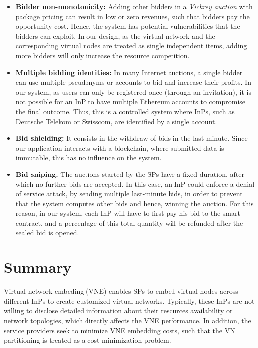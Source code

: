 \begin{itemize}
 \item \textbf{Bidder non-monotonicity:} Adding other bidders in a \textit{Vickrey auction} with package pricing can result in low or zero revenues, such that bidders pay the opportunity cost. Hence, the system has potential vulnerabilities that the bidders can exploit. In our design, as the virtual network and the corresponding virtual nodes are treated as single independent items, adding more bidders will only increase the resource competition.
    \item \textbf{Multiple bidding identities:} In many Internet auctions, a single bidder can use multiple pseudonyms or accounts to bid and increase their profits. In our system, as users can only be registered once (through an invitation), it is not possible for an InP to have multiple Ethereum accounts to compromise the final outcome. Thus, this is a controlled system where InPs, such as Deutsche Telekom or Swisscom, are identified by a single account.
    \item \textbf{Bid shielding:} It consists in the withdraw of bids in the last minute. Since our application interacts with a blockchain, where submitted data is immutable, this has no influence on the system.
    \item \textbf{Bid sniping:} The auctions started by the SPs have a fixed duration, after which no further bids are accepted. In this case, an InP could enforce a denial of service attack, by sending multiple last-minute bids, in order to prevent that the system computes other bids and hence, winning the auction. For this reason, in our system, each InP will have to first pay his bid to the smart contract, and a percentage of this total quantity will be refunded after the sealed bid is opened.
\end{itemize}


\section{Summary}

Virtual network embeding (VNE) enables SPs to embed virtual nodes across different InPs to create customized virtual networks. Typically, these InPs are not willing to disclose detailed information about their resources availability or network topologies, which directly affects the VNE performance. In addition, the service providers seek to minimize VNE embedding costs, such that the VN partitioning is treated as a cost minimization problem.

